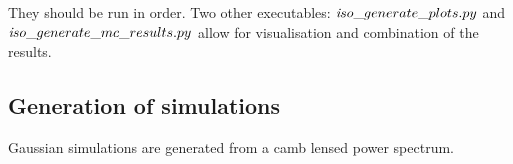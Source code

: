\documentclass[a4paper, 11pt]{article}
\begin{document}
They should be run in order.  
Two other executables:  ${\textit  iso\_generate\_plots.py  }$ and ${\textit  iso\_generate\_mc\_results.py  }$ allow for visualisation and combination of the results.

\subsection{Generation of simulations}

Gaussian simulations are generated from a camb lensed power spectrum.
\end{document}
